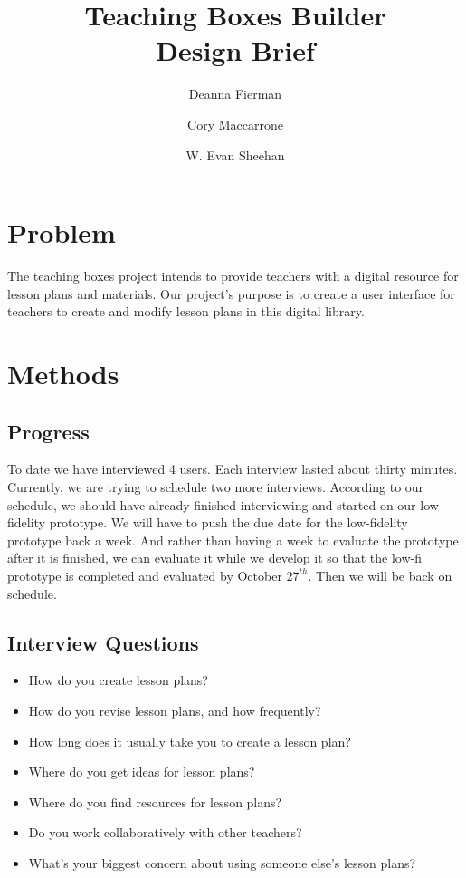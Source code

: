 \documentclass[12pt,titlepage]{article}
\title{Teaching Boxes Builder \\ Design Brief}
\author{Deanna Fierman \and Cory Maccarrone \and W. Evan Sheehan}
\begin{document}
\maketitle

\hfill
\thispagestyle{empty}
\pagebreak
\setcounter{page}{0}

\section{Problem}
The teaching boxes project intends to provide teachers with a digital resource
for lesson plans and materials. Our project's purpose is to create a user
interface for teachers to create and modify lesson plans in this digital
library.

\section{Methods}
\subsection{Progress}
To date we have interviewed 4 users. Each interview lasted about thirty minutes.
Currently, we are trying to schedule two more interviews. According to our
schedule, we should have already finished interviewing and started on our
low-fidelity prototype. We will have to push the due date for the low-fidelity
prototype back a week. And rather than having a week to evaluate the prototype
after it is finished, we can evaluate it while we develop it so that the low-fi
prototype is completed and evaluated by October $27^{th}$. Then we will be back
on schedule.

\subsection{Interview Questions}
\begin{itemize}
	\item How do you create lesson plans?
	\item How do you revise lesson plans, and how frequently?
	\item How long does it usually take you to create a lesson plan?
	\item Where do you get ideas for lesson plans?
	\item Where do you find resources for lesson plans?
	\item Do you work collaboratively with other teachers?
	\item What's your biggest concern about using someone else's lesson plans?
\end{itemize}

\pagebreak
\hfill
\end{document}
